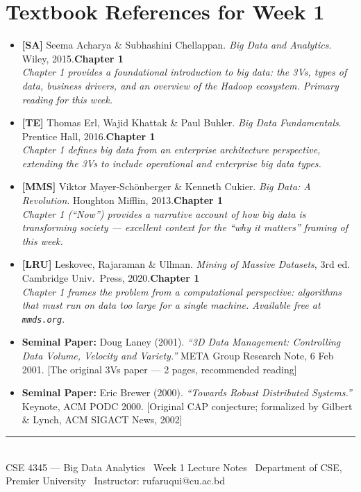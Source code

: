 \documentclass[12pt,a4paper]{article}
\begin{document}
\section*{Textbook References for Week 1}

\begin{itemize}[leftmargin=2em, itemsep=6pt]
  \item \textbf{[SA]} Seema Acharya \& Subhashini Chellappan. \textit{Big Data and Analytics}. Wiley, 2015.\hfill\textbf{Chapter 1}\\
        \small\textit{Chapter 1 provides a foundational introduction to big data: the 3Vs, types of data, business drivers, and an overview of the Hadoop ecosystem. Primary reading for this week.}

  \item \textbf{[TE]} Thomas Erl, Wajid Khattak \& Paul Buhler. \textit{Big Data Fundamentals}. Prentice Hall, 2016.\hfill\textbf{Chapter 1}\\
        \small\textit{Chapter 1 defines big data from an enterprise architecture perspective, extending the 3Vs to include operational and enterprise big data types.}

  \item \textbf{[MMS]} Viktor Mayer-Schönberger \& Kenneth Cukier. \textit{Big Data: A Revolution}. Houghton Mifflin, 2013.\hfill\textbf{Chapter 1}\\
        \small\textit{Chapter 1 (``Now'') provides a narrative account of how big data is transforming society — excellent context for the ``why it matters'' framing of this week.}

  \item \textbf{[LRU]} Leskovec, Rajaraman \& Ullman. \textit{Mining of Massive Datasets}, 3rd ed. Cambridge Univ.\ Press, 2020.\hfill\textbf{Chapter 1}\\
        \small\textit{Chapter 1 frames the problem from a computational perspective: algorithms that must run on data too large for a single machine. Available free at \texttt{mmds.org}.}

  \item \textbf{Seminal Paper:} Doug Laney (2001). \textit{``3D Data Management: Controlling Data Volume, Velocity and Variety.''} META Group Research Note, 6 Feb 2001. [The original 3Vs paper — 2 pages, recommended reading]

  \item \textbf{Seminal Paper:} Eric Brewer (2000). \textit{``Towards Robust Distributed Systems.''} Keynote, ACM PODC 2000. [Original CAP conjecture; formalized by Gilbert \& Lynch, ACM SIGACT News, 2002]
\end{itemize}

\vspace{12pt}
\noindent\rule{\linewidth}{0.8pt}\\[4pt]
{\small\textcolor{PUGray}{CSE 4345 — Big Data Analytics \textbar\ Week 1 Lecture Notes \textbar\
Department of CSE, Premier University \textbar\ Instructor: rufaruqui@cu.ac.bd}}
\end{document}
